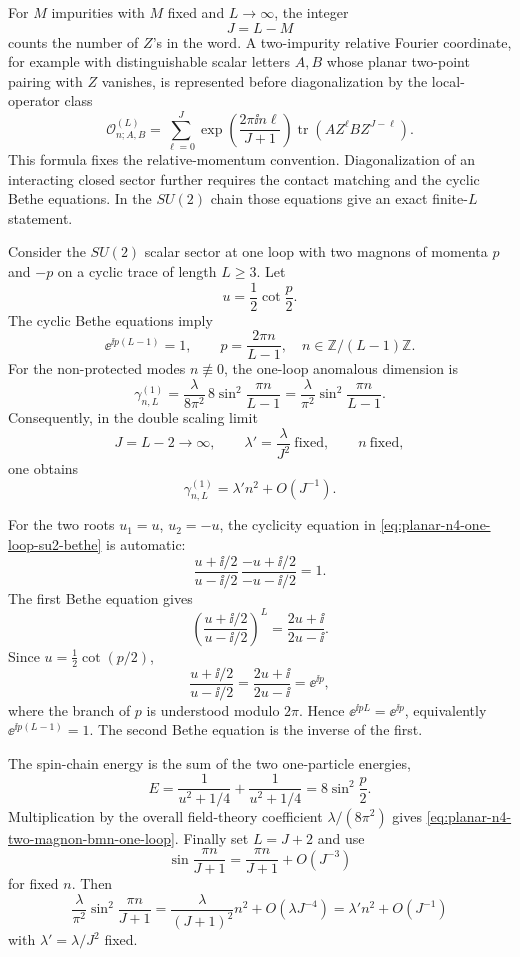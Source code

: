 For \(M\) impurities with \(M\) fixed and \(L\to\infty\), the integer
\[
  J=L-M
\]
counts the number of \(Z\)'s in the word.  A two-impurity relative Fourier
coordinate, for example with distinguishable scalar letters \(A,B\) whose
planar two-point pairing with \(Z\) vanishes, is represented before
diagonalization by the local-operator class
\[
  \mathcal O_{n;A,B}^{(L)}
  =
  \sum_{\ell=0}^{J}
  \exp\!\left(\frac{2\pi\ii n\ell}{J+1}\right)
  \operatorname{tr}\!\left(A Z^\ell B Z^{J-\ell}\right).
\]
This formula fixes the relative-momentum convention.  Diagonalization of an
interacting closed sector further requires the contact matching and the
cyclic Bethe equations.  In the \(SU(2)\) chain those equations give an exact
finite-\(L\) statement.

\begin{example}
\label{ex:planar-n4-two-magnon-bmn-quantization}
Consider the \(SU(2)\) scalar sector at one loop with two magnons of momenta
\(p\) and \(-p\) on a cyclic trace of length \(L\geq3\).  Let
\[
  u=\frac12\cot\frac p2 .
\]
The cyclic Bethe equations imply
\[
  \ee^{\ii p(L-1)}=1,
  \qquad
  p=\frac{2\pi n}{L-1},\quad n\in\mathbb Z/(L-1)\mathbb Z .
\]
For the non-protected modes \(n\not\equiv0\), the one-loop anomalous
dimension is
\begin{equation}
  \gamma^{(1)}_{n,L}
  =
  \frac{\lambda}{8\pi^2}\,
  8\sin^2\frac{\pi n}{L-1}
  =
  \frac{\lambda}{\pi^2}
  \sin^2\frac{\pi n}{L-1}.
  \label{eq:planar-n4-two-magnon-bmn-one-loop}
\end{equation}
Consequently, in the double scaling limit
\[
  J=L-2\to\infty,\qquad
  \lambda'=\frac{\lambda}{J^2}\ \text{fixed},\qquad n\ \text{fixed},
\]
one obtains
\[
  \gamma^{(1)}_{n,L}
  =
  \lambda' n^2+O(J^{-1}).
\]

For the two roots \(u_1=u\), \(u_2=-u\), the cyclicity equation in
\eqref{eq:planar-n4-one-loop-su2-bethe} is automatic:
\[
  \frac{u+\ii/2}{u-\ii/2}\,
  \frac{-u+\ii/2}{-u-\ii/2}=1 .
\]
The first Bethe equation gives
\[
  \left(\frac{u+\ii/2}{u-\ii/2}\right)^L
  =
  \frac{2u+\ii}{2u-\ii}.
\]
Since \(u=\frac12\cot(p/2)\),
\[
  \frac{u+\ii/2}{u-\ii/2}
  =
  \frac{2u+\ii}{2u-\ii}
  =
  \ee^{\ii p},
\]
where the branch of \(p\) is understood modulo \(2\pi\).  Hence
\(\ee^{\ii pL}=\ee^{\ii p}\), equivalently
\(\ee^{\ii p(L-1)}=1\).  The second Bethe equation is the inverse of the
first.

The spin-chain energy is the sum of the two one-particle energies,
\[
  E
  =
  \frac{1}{u^2+1/4}+\frac{1}{u^2+1/4}
  =
  8\sin^2\frac p2 .
\]
Multiplication by the overall field-theory coefficient
\(\lambda/(8\pi^2)\) gives
\eqref{eq:planar-n4-two-magnon-bmn-one-loop}.  Finally set \(L=J+2\) and
use
\[
  \sin\frac{\pi n}{J+1}
  =
  \frac{\pi n}{J+1}+O(J^{-3})
\]
for fixed \(n\).  Then
\[
  \frac{\lambda}{\pi^2}\sin^2\frac{\pi n}{J+1}
  =
  \frac{\lambda}{(J+1)^2}n^2+O(\lambda J^{-4})
  =
  \lambda'n^2+O(J^{-1})
\]
with \(\lambda'=\lambda/J^2\) fixed.
\end{example}

